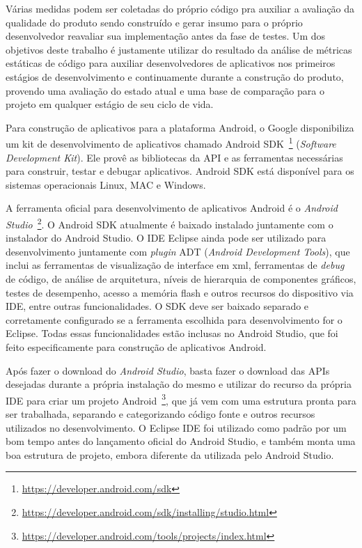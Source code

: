 Várias medidas podem ser coletadas do próprio código pra auxiliar a avaliação da qualidade do produto sendo construído e gerar insumo para o próprio desenvolvedor reavaliar sua implementação antes da fase de testes. Um dos objetivos deste trabalho é justamente utilizar do resultado da análise de métricas estáticas de código para auxiliar desenvolvedores de aplicativos nos primeiros estágios de desenvolvimento e continuamente durante a construção do produto, provendo uma avaliação do estado atual e uma base de comparação para o projeto em qualquer estágio de seu ciclo de vida.

Para construção de aplicativos para a plataforma Android, o Google disponibiliza um kit de desenvolvimento de aplicativos chamado Android SDK~\footnote{\url{https://developer.android.com/sdk}} (\textit{Software Development Kit}). Ele provê as bibliotecas da API e as ferramentas necessárias para construir, testar e debugar aplicativos. Android SDK está disponível para os sistemas operacionais Linux, MAC e Windows.

A ferramenta oficial para desenvolvimento de aplicativos Android é o \textit{Android Studio}~\footnote{\url{https://developer.android.com/sdk/installing/studio.html}}. O Android SDK atualmente é baixado instalado juntamente com o instalador do Android Studio. O IDE Eclipse ainda pode ser utilizado para desenvolvimento juntamente com \textit{plugin} ADT (\textit{Android Development Tools}), que inclui as ferramentas de visualização de interface em xml, ferramentas de \textit{debug} de código, de análise de arquitetura, níveis de hierarquia de componentes gráficos, testes de desempenho, acesso a memória flash e outros recursos do dispositivo via IDE, entre outras funcionalidades.  O SDK deve ser baixado separado e corretamente configurado se a ferramenta escolhida para desenvolvimento for o Eclipse. Todas essas funcionalidades estão inclusas no Android Studio, que foi feito especificamente para construção de aplicativos Android.

Após fazer o download do \textit{Android Studio}, basta fazer o download das APIs desejadas durante a própria instalação do mesmo e utilizar do recurso da própria IDE para criar um projeto Android~\footnote{\url{https://developer.android.com/tools/projects/index.html}}, que já vem com uma estrutura pronta para ser trabalhada, separando e categorizando código fonte e outros recursos utilizados no desenvolvimento. O Eclipse IDE foi utilizado como padrão por um bom tempo antes do lançamento oficial do Android Studio, e também monta uma boa estrutura de projeto, embora diferente da utilizada pelo Android Studio.

